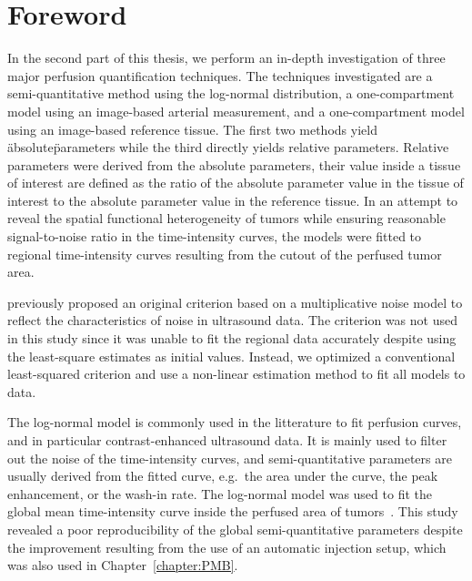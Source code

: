 \chapter*{Foreword}
In the second part of this thesis, we perform an in-depth investigation of three major perfusion quantification techniques.
The techniques investigated are a semi-quantitative method using the log-normal distribution, a one-compartment model using an image-based arterial measurement, and a one-compartment model using an image-based reference tissue. 
The first two methods yield \"absolute\" parameters while the third directly yields relative parameters.
Relative parameters were derived from the absolute parameters, their value inside a tissue of interest are defined as the ratio of the absolute parameter value in the tissue of interest to the absolute parameter value in the reference tissue.
In an attempt to reveal the spatial functional heterogeneity of tumors while ensuring reasonable signal-to-noise ratio in the time-intensity curves, the models were fitted to regional time-intensity curves resulting from the cutout of the perfused tumor area. 

\citet{Barrois:2013gw} previously proposed an original criterion based on a multiplicative noise model to reflect the characteristics of noise in ultrasound data.
The criterion was not used in this study since it was unable to fit the regional data accurately despite using the least-square estimates as initial values. 
Instead, we optimized a conventional least-squared criterion and use a non-linear estimation method to fit all models to data.

The log-normal model is commonly used in the litterature to fit perfusion curves, and in particular contrast-enhanced ultrasound data.
It is mainly used to filter out the noise of the time-intensity curves, and semi-quantitative parameters are usually derived from the fitted curve, e.g.~the area under the curve, the peak enhancement, or the wash-in rate. 
The log-normal model was used to fit the global mean time-intensity curve inside the perfused area of tumors~\cite{Dizeux2016cd}.
This study revealed a poor reproducibility of the global semi-quantitative parameters despite the improvement resulting from the use of an automatic injection setup, which was also used in Chapter~\ref{chapter:PMB}.

